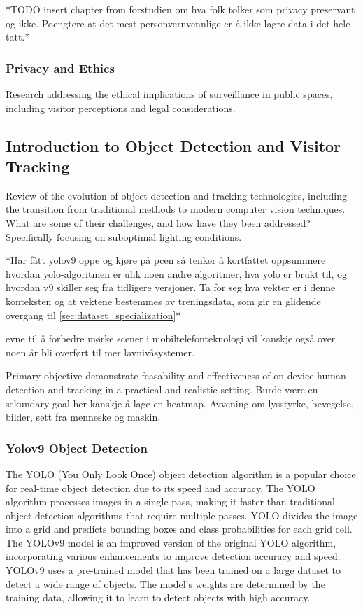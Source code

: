*TODO insert chapter from forstudien om hva folk tolker som privacy preservant og ikke. Poengtere at det mest personvernvennlige er å ikke lagre data i det hele tatt.*

\subsubsection{Privacy and Ethics}
Research addressing the ethical implications of surveillance in public spaces, including visitor perceptions and legal considerations.



\subsection{Introduction to Object Detection and Visitor Tracking}
Review of the evolution of object detection and tracking technologies, including the transition from traditional methods to modern computer vision techniques. What are some of their challenges, and how have they been addressed? Specifically focusing on suboptimal lighting conditions.

*Har fått yolov9 oppe og kjøre på pcen så tenker å kortfattet oppsummere hvordan yolo-algoritmen er ulik noen andre algoritmer, hva yolo er brukt til, og hvordan v9 skiller seg fra tidligere versjoner. Ta for seg hva vekter er i denne konteksten og at vektene bestemmes av treningsdata, som gir en glidende overgang til \ref{sec:dataset_specialization}* 

evne til å forbedre mørke scener i mobiltelefonteknologi vil kanskje også over noen år bli overført til mer lavnivåsystemer.

Primary objective demonstrate feasability and effectiveness of on-device human detection and tracking in a practical and realistic setting.
Burde være en sekundary goal her kanskje å lage en heatmap.
Avvening om lysstyrke, bevegelse, bilder, sett fra menneske og maskin.


\subsubsection{Yolov9 Object Detection}
The YOLO (You Only Look Once) object detection algorithm is a popular choice for real-time object detection due to its speed and accuracy. The YOLO algorithm processes images in a single pass, making it faster than traditional object detection algorithms that require multiple passes. YOLO divides the image into a grid and predicts bounding boxes and class probabilities for each grid cell. The YOLOv9 model is an improved version of the original YOLO algorithm, incorporating various enhancements to improve detection accuracy and speed. YOLOv9 uses a pre-trained model that has been trained on a large dataset to detect a wide range of objects. The model's weights are determined by the training data, allowing it to learn to detect objects with high accuracy.





